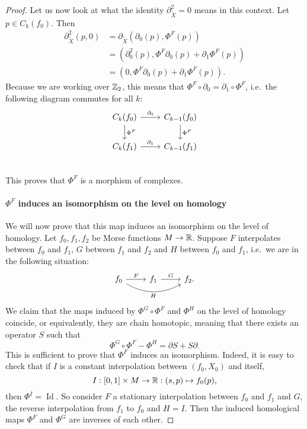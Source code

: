 \begin{proof}
Let us now look at what the identity $\partial_{\tilde{X}}^2 = 0$ means in this context. Let $p \in C_k(f_0)$.
Then
\begin{align*}
    \partial_{\tilde{X}}^2 (p, 0) &= \partial_{\tilde{X}}(\partial_{0}(p),  \Phi^{F}(p))\\
                                                      &= (\partial_0^2(p), \Phi^{F}\partial_0(p)+ \partial_1 \Phi^{F}(p))\\
                                                    &= (0, \Phi^{F}\partial_0(p)+ \partial_1 \Phi^{F}(p))
.\end{align*} 
Because we are working over $\mathbb{Z}_2$, this means that $\Phi^{F}  \circ  \partial_0 = \partial_1  \circ  \Phi^{F}$, i.e.\ the following diagram commutes for all $k$:
\[
    \begin{tikzcd}
        C_k(f_0) \arrow[d, "\Phi^{F}"]\arrow[r, "\partial_0"] &C_{k-1}(f_0) \arrow[d, "\Phi^{F}"]\\
        C_k(f_1) \arrow[r, "\partial_1"] &C_{k-1}(f_1)\\
    \end{tikzcd}
\]
This proves that $\Phi^{F}$ is a morphism of complexes.

\paragraph{$\Phi^{F}$ induces an isomorphism on the level on homology}

We will now prove that this map induces an isomorphism on the level of homology.
Let $f_0, f_1, f_2$ be Morse functions $M \to  \mathbb{R}$.
Suppose $F$ interpolates between $f_0$ and $f_1$,
$G$ between $f_1$ and $f_2$ and $H$ between $f_0$ and $f_1$, i.e.\ we are in the following situation:
\[
    \begin{tikzcd}
        f_0 \arrow[rr, "H"', bend right] \arrow[r, "F"] &f_1 \arrow[r, "G"] &f_2.
    \end{tikzcd}
\]
We claim that the maps induced by $\Phi^{G} \circ \Phi^{F}$ and $\Phi^{H}$ on the level of homology coincide, or equivalently, they are chain homotopic, meaning that there exists an operator $S$ such that
 \[
\Phi^{G}  \circ  \Phi^{F} - \Phi^{H} = \partial S + S \partial
.\] 
This is sufficient to prove that $\Phi^{F}$ induces an isomorphism.
Indeed, it is easy to check that if $I$ is a constant interpolation between  $(f_0, X_0)$ and itself, 
\[
    I: [0,1] \times M \to  \mathbb{R}: (s, p) \mapsto f_0(p),
\] 
then $\Phi^{I} = \operatorname{Id}$.
So consider $F$ a stationary interpolation between $f_0$ and $f_1$ and $G$, the reverse interpolation from $f_1$ to $f_0$ and $H = I$. Then the induced homological maps $\Phi^{F}$ and $\Phi^{G}$ are inverses of each other.


\end{proof}
